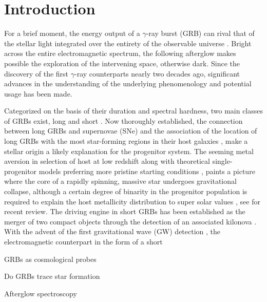 \documentclass{aa}    %
\begin{document}
\section{Introduction}

For a brief moment, the energy output of a $\gamma$-ray burst (GRB) can rival
that of the stellar light integrated over the entirety of the observable
universe \citep{Kumar2015}. Bright across the entire electromagnetic spectrum,
the following afterglow makes possible the exploration of the intervening space,
otherwise dark. Since the discovery of the first $\gamma$-ray counterparts
nearly two decades ago\citep{Costa1997a, VanParadijs1997, Djorgovski1997,
	Frail1997, Wijers1998}, significant advances in the understanding of the underlying
phenomenology and potential usage has been made.

Categorized on the basis of their duration and spectral hardness, two main classes of GRBs exist, long and short \citep{Kouveliotou1993}. Now thoroughly established, the connection between long GRBs and supernovae (SNe) \citep{Galama1998, Hjorth2003a, Stanek2003, Woosley2006c} and the association of the location of long GRBs with the most star-forming regions in their host galaxies \citep{Fruchter2006, Svensson2010a}, make a stellar origin a likely explanation for the progenitor system. The seeming metal aversion \citep{Graham2013, Kruhler2015, Perley2016b} in selection of host at low redshift along with theoretical single-progenitor models preferring more pristine starting conditions \citep{Woosley2006d}, paints a picture where the core of a rapidly spinning, massive star undergoes gravitational collapse, although a certain degree of binarity \citep{Fryer2005, Podsiadlowski2010} in the progenitor population is required to explain the host metallicity distribution to super solar values \citep{Niino2011}, see \citet{Levan2016} for recent review. The driving engine in short GRBs has been established as the merger of two compact objects \citep{Metzger2010} through the detection of an associated kilonova \citep{Tanvir2013a, Berger2013a}. With the advent of the first gravitational wave (GW) detection \cite{Abbott2016a}, the electromagnetic counterpart in the form of a short


GRBs as cosmological probes

Do GRBs trace star formation

Afterglow spectroscopy
\end{document}
